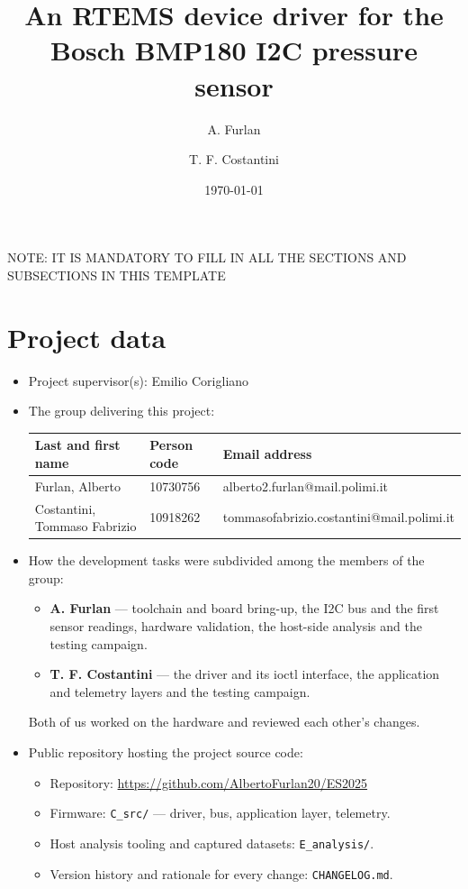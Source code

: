 \documentclass[10pt,a4]{article}
\author{A. Furlan \and T. F. Costantini}
\date{\today}
\title{An RTEMS device driver for the Bosch BMP180 I2C pressure sensor}
\begin{document}
\maketitle
\tableofcontents

\begin{center}
NOTE: IT IS MANDATORY TO FILL IN ALL THE SECTIONS AND SUBSECTIONS IN THIS TEMPLATE
\end{center}

\section{Project data}

\begin{itemize}
\item 
  Project supervisor(s): Emilio Corigliano

\item 
The group delivering this project:

\begin{center}
\begin{tabular}{lll}
Last and first name & Person code & Email address\\
\hline
  Furlan, Alberto & 10730756 & alberto2.furlan@mail.polimi.it \\
  Costantini, Tommaso Fabrizio & 10918262 & tommasofabrizio.costantini@mail.polimi.it \\
\end{tabular}
\end{center}

\item
How the development tasks were subdivided among the members of the group:

\begin{itemize}
\item \textbf{A. Furlan} --- toolchain and board bring-up, the I2C bus and the
  first sensor readings, hardware validation, the host-side analysis and the testing campaign.
\item \textbf{T. F. Costantini} --- the driver and its ioctl interface, the
  application and telemetry layers and the testing campaign.
\end{itemize}

Both of us worked on the hardware and reviewed each other's changes.

\item Public repository hosting the project source code:

\begin{itemize}
\item Repository: \url{https://github.com/AlbertoFurlan20/ES2025}
\item Firmware: \texttt{C\_src/} --- driver, bus, application layer, telemetry.
\item Host analysis tooling and captured datasets: \texttt{E\_analysis/}.
\item Version history and rationale for every change: \texttt{CHANGELOG.md}.
\end{itemize}

\end{itemize}
\end{document}
